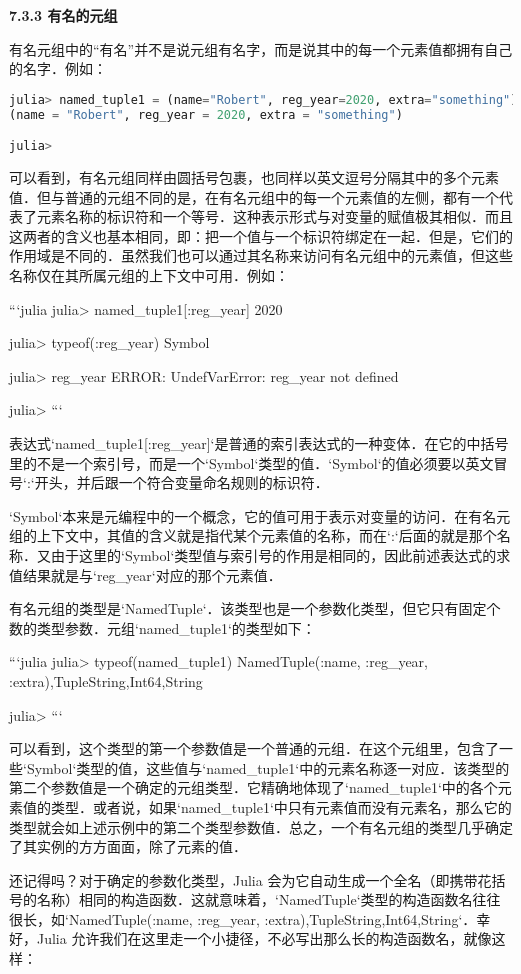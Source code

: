 \textbf{7.3.3 有名的元组}

有名元组中的“有名”并不是说元组有名字，而是说其中的每一个元素值都拥有自己的名字．例如：
\begin{lstlisting}[language=julia]
julia> named_tuple1 = (name="Robert", reg_year=2020, extra="something")
(name = "Robert", reg_year = 2020, extra = "something")

julia> 
\end{lstlisting}

可以看到，有名元组同样由圆括号包裹，也同样以英文逗号分隔其中的多个元素值．但与普通的元组不同的是，在有名元组中的每一个元素值的左侧，都有一个代表了元素名称的标识符和一个等号．这种表示形式与对变量的赋值极其相似．而且这两者的含义也基本相同，即：把一个值与一个标识符绑定在一起．但是，它们的作用域是不同的．虽然我们也可以通过其名称来访问有名元组中的元素值，但这些名称仅在其所属元组的上下文中可用．例如：

```julia
julia> named_tuple1[:reg_year]
2020

julia> typeof(:reg_year)
Symbol

julia> reg_year
ERROR: UndefVarError: reg_year not defined

julia> 
```

表达式`named_tuple1[:reg_year]`是普通的索引表达式的一种变体．在它的中括号里的不是一个索引号，而是一个`Symbol`类型的值．`Symbol`的值必须要以英文冒号`:`开头，并后跟一个符合变量命名规则的标识符．

`Symbol`本来是元编程中的一个概念，它的值可用于表示对变量的访问．在有名元组的上下文中，其值的含义就是指代某个元素值的名称，而在`:`后面的就是那个名称．又由于这里的`Symbol`类型值与索引号的作用是相同的，因此前述表达式的求值结果就是与`reg_year`对应的那个元素值．

有名元组的类型是`NamedTuple`．该类型也是一个参数化类型，但它只有固定个数的类型参数．元组`named_tuple1`的类型如下：

```julia
julia> typeof(named_tuple1)
NamedTuple{(:name, :reg_year, :extra),Tuple{String,Int64,String}}

julia> 
```

可以看到，这个类型的第一个参数值是一个普通的元组．在这个元组里，包含了一些`Symbol`类型的值，这些值与`named_tuple1`中的元素名称逐一对应．该类型的第二个参数值是一个确定的元组类型．它精确地体现了`named_tuple1`中的各个元素值的类型．或者说，如果`named_tuple1`中只有元素值而没有元素名，那么它的类型就会如上述示例中的第二个类型参数值．总之，一个有名元组的类型几乎确定了其实例的方方面面，除了元素的值．

还记得吗？对于确定的参数化类型，Julia 会为它自动生成一个全名（即携带花括号的名称）相同的构造函数．这就意味着，`NamedTuple`类型的构造函数名往往很长，如`NamedTuple{(:name, :reg_year, :extra),Tuple{String,Int64,String}}`．幸好，Julia 允许我们在这里走一个小捷径，不必写出那么长的构造函数名，就像这样：

